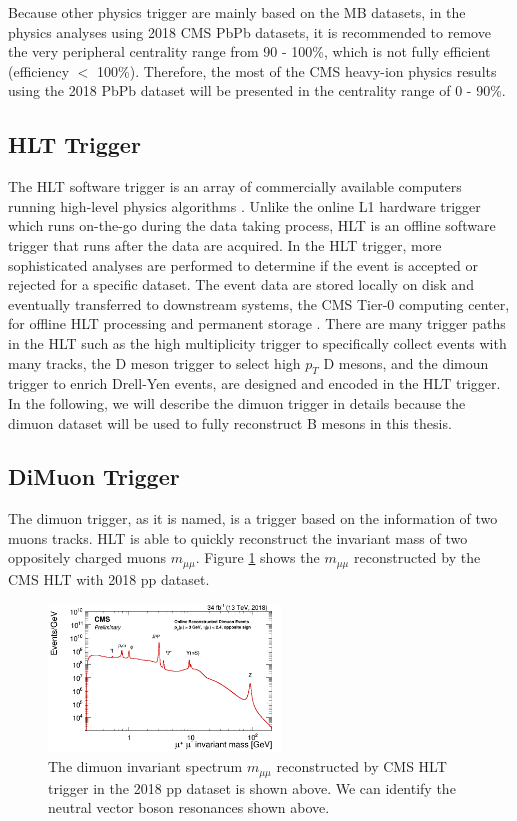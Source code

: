 Because other physics trigger are mainly based on the MB datasets, in the physics analyses using 2018 CMS PbPb datasets, it is recommended to remove the very peripheral centrality range from 90 - 100\%, which is not fully efficient (efficiency $<$ 100\%). Therefore, the most of the CMS heavy-ion physics results using the 2018 PbPb dataset will be presented in the centrality range of 0 - 90\%.

\subsection{HLT Trigger}

The HLT software trigger is an array of commercially available computers running high-level physics algorithms \cite{CMSTrigger}. Unlike the online L1 hardware trigger which runs on-the-go during the data taking process, HLT is an offline software trigger that runs after the data are acquired. In the HLT trigger, more sophisticated analyses are performed to determine if the event is accepted or rejected for a specific dataset. The event data are stored locally on disk and eventually transferred to downstream systems, the CMS Tier-0 computing center, for offline HLT processing and permanent storage \cite{CMSTrigger}. There are many trigger paths in the HLT such as the high multiplicity trigger to specifically collect events with many tracks, the D meson trigger to select high $p_T$ D mesons, and the dimoun trigger to enrich Drell-Yen events, are designed and encoded in the HLT trigger. In the following, we will describe the dimuon trigger in details because the dimuon dataset will be used to fully reconstruct B mesons in this thesis. 

\subsection{DiMuon Trigger}

The dimuon trigger, as it is named, is a trigger based on the information of two muons tracks. HLT is able to quickly reconstruct the invariant mass of two oppositely charged muons $m_{\mu\mu}$. Figure \ref{DimuonInvMass} shows the $m_{\mu\mu}$ reconstructed by the CMS HLT with 2018 pp dataset.

\begin{figure}[hbtp]
\begin{center}
\includegraphics[width=0.55\textwidth]{Figures/Chapter3/DimuonInvMass.png}
\caption{The dimuon invariant spectrum $m_{\mu\mu}$ reconstructed by CMS HLT trigger in the 2018 pp dataset is shown above. We can identify the neutral vector boson resonances shown above.}
\label{DimuonInvMass}
\end{center}
\end{figure} 


